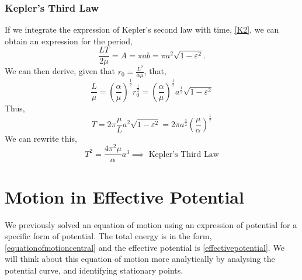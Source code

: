 \documentclass{book}
\begin{document}
\subsubsection{Kepler's Third Law}
If we integrate the expression of Kepler's second law with time, \eqref{K2}, we can obtain an expression for the period,
\begin{equation}
    \frac{LT}{2\mu} = A = \pi ab = \pi a^2 \sqrt{1-\varepsilon^2}.
\end{equation}
We can then derive, given that $r_0 = \frac{L^2}{\alpha \mu}$, that,
\begin{equation}
    \frac{L}{\mu} = \left(\frac{\alpha}{\mu}\right)^{\frac{1}{2}}r_0^{\frac{1}{2}} = \left(\frac{\alpha}{\mu}\right)^{\frac{1}{2}}a^{\frac{1}{2}}\sqrt{1-\varepsilon^2}
\end{equation}
Thus,
\begin{equation}
    T = 2\pi \frac{\mu}{L} a^2 \sqrt{1 - \varepsilon^2} = 2\pi a^{\frac{3}{2}}\left(\frac{\mu}{\alpha}\right)^{\frac{1}{2}}
\end{equation}
We can rewrite this,
\begin{equation}
    T^2 = \frac{4\pi^2 \mu}{\alpha}a^3 \implies \text{ Kepler's Third Law}
\end{equation}
\section{Motion in Effective Potential}
We previously solved an equation of motion using an expression of potential for a specific form of potential. The total energy is in the form, \eqref{equationofmotioncentral} and the effective potential is \eqref{effectivepotential}. We will think about this equation of motion more analytically by analysing the potential curve, and identifying stationary points.
\end{document}

